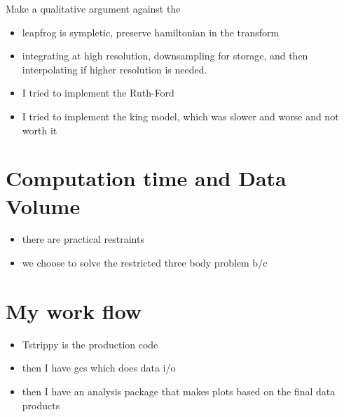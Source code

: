     Make a qualitative argument against the 

    \begin{itemize}
        \item leapfrog is sympletic, preserve hamiltonian in the transform
        \item integrating at high resolution, downsampling for storage, and then interpolating if higher resolution is needed. 
        \item I tried to implement the Ruth-Ford
        \item I tried to implement the king model, which was slower and worse and not worth it 
    \end{itemize}


    \section{Computation time and Data Volume}
    \begin{itemize}
        \item there are practical restraints
        \item we choose to solve the restricted three body problem b/c
    \end{itemize}

\section{My work flow}
    \begin{itemize}
        \item Tstrippy is the production code
        \item then I have gcs which does data i/o
        \item then I have an analysis package that makes plots based on the final data products
    \end{itemize}

